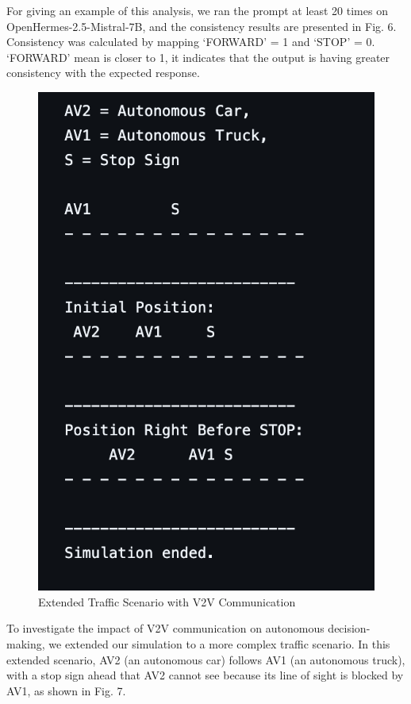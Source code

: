 \documentclass[conference]{IEEEtran}
\begin{document}
For giving an example of this analysis, we ran the prompt at least 20 times on OpenHermes-2.5-Mistral-7B, and the consistency results are presented in Fig. 6. Consistency was calculated by mapping `FORWARD' = 1 and `STOP' = 0. `FORWARD' mean is closer to 1, it indicates that the output is having greater consistency with the expected response.

 \begin{figure}[h]
     \centering
     \includegraphics[width=.8\linewidth]{Fig/Communication_agent.png}
     \caption{Extended Traffic Scenario with V2V Communication }
     \label{fig:enter-label}
 \end{figure}
To investigate the impact of V2V communication on autonomous decision-making, we extended our simulation to a more complex traffic scenario. In this extended scenario, AV2 (an autonomous car) follows AV1 (an autonomous truck), with a stop sign ahead that AV2 cannot see because its line of sight is blocked by AV1, as shown in Fig. 7.
\end{document}
